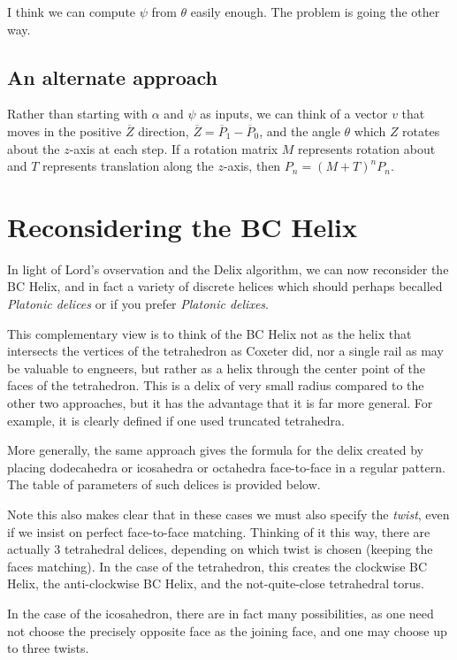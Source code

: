 \documentclass[11pt]{article}
\begin{document}
I think we can compute $\psi$ from $\theta$ easily enough. The problem is going the other way.

\subsection{An alternate approach}

Rather than starting with $\alpha$ and $\psi$ as inputs, we can think of a vector $v$ that
moves in the positive $\overline Z$ direction, $\overline Z = \overline P_1 - \overline P_0$, and
the angle $\theta$ which $Z$ rotates about the $z$-axis at each step. If a rotation matrix $M$
represents rotation about and $T$ represents translation along the $z$-axis, then $P_n = (M+T)^nP_n$.

\section{Reconsidering the BC Helix}

In light of Lord's ovservation and the Delix algorithm, we can now
reconsider the BC Helix, and in fact a variety of discrete helices which
should perhaps becalled {\em Platonic delices} or if you prefer {\em Platonic delixes}.

This complementary view is to think of the BC Helix not as the helix that
intersects the vertices of the tetrahedron as Coxeter did, nor a single
rail as may be valuable to engneers\cite{}, but rather as a helix through
the center point of the faces of the tetrahedron. This is a delix of
very small radius compared to the other two approaches, but it has
the advantage that it is far more general. For example, it is
clearly defined if one used truncated tetrahedra.

More generally, the same approach gives the formula for the delix
created by placing dodecahedra or icosahedra or octahedra face-to-face
in a regular pattern. The table of parameters of such delices is provided
below.

Note this also makes clear that in these cases we must also specify the {\em twist},
even if we insist on perfect face-to-face matching. Thinking of it this
way, there are actually 3 tetrahedral delices, depending on which twist
is chosen (keeping the faces matching). In the case of the tetrahedron,
this creates the clockwise BC Helix, the anti-clockwise BC Helix, and the
not-quite-close tetrahedral torus.

In the case of the icosahedron, there are in fact many possibilities,
as one need not choose the precisely opposite face as the joining face, and
one may choose up to three twists.
\end{document}
